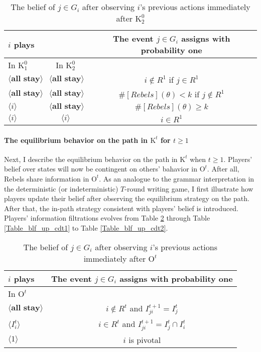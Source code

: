 \documentclass[12pt,letter]{article}
\newcommand{\Kappa}{\mathrm{K}}
\newcommand{\Omicron}{\mathrm{O}}
\theoremstyle{definition}
\theoremstyle{remark}
\theoremstyle{claim}
\begin{document}
\begin{table}[!htbp]
\caption{The belief of $j\in G_i$ after observing $i$'s previous actions immediately after $\Kappa^0_{2}$}
\label{Table_blf_up_cd02}
\begin{center}
\begin{tabular}{l  c | c}
 	$i$ plays	  	&  	  &The event $j\in G_i$ assigns with probability one \\
\hline
\hline
	In $\Kappa^0_{1}$		&			In $\Kappa^0_{2}$	&  \\
\hline
  $\langle \textbf{all stay} \rangle$	&  $\langle \textbf{all stay} \rangle$ &  $i\notin R^1$ if $j\in R^1$ \\
  $\langle \textbf{all stay} \rangle$	&  $\langle \textbf{all stay} \rangle$ &  $\#[Rebels](\theta)< k$ if $j\notin R^1$\\
  $\langle i \rangle$	&	$\langle \textbf{all stay} \rangle$ &  $\#[Rebels](\theta)\geq k$    \\
  $\langle i \rangle$	&	$\langle i \rangle$ &  $i\in R^1$  \\
  \hline
\end{tabular}
\end{center}
\end{table}

\clearpage

\paragraph{The equilibrium behavior on the path in $\Kappa^t$ for $t\geq 1$}
Next, I describe the equilibrium behavior on the path in $\Kappa^t$ when $t\geq 1$. Players' belief over states will now be contingent on others' bahavior in $\Omicron^t$. After all, Rebels share information in $\Omicron^t$. As an analogue to the grammar interpretation in the deterministic (or indeterministic) $T$-round writing game, I first illustrate how players update their belief after observing the equilibrium strategy on the path. After that, the in-path strategy consistent with players' belief is introduced. Players' information filtrations evolves from Table \ref{Table_blf_up_rpt} through Table \ref{Table_blf_up_cdt1} to Table \ref{Table_blf_up_cdt2}.

\begin{table}[!htbp]
\caption{The belief of $j\in G_i$ after observing $i$'s previous actions immediately after $\Omicron^t$ }
\label{Table_blf_up_rpt}
\begin{center}
\begin{tabular}{l | c}
 $i$ plays  		&	 The event $j\in G_i$ assigns with probability one \\
\hline
\hline
 In $\Omicron^t$		&					 \\
\hline
$\langle \textbf{all stay} \rangle$  &     $i\notin R^t$ and $I^{t+1}_{ji}=I^t_j$ \\
$\langle I^t_{i} \rangle$  &     $i\in R^t$ and $I^{t+1}_{ji}=I^t_j\cap I^t_{i}$ \\
$\langle 1 \rangle$  & 	  $i$ is pivotal    \\
  \hline
\end{tabular}
\end{center}
\end{table}
\end{document}
